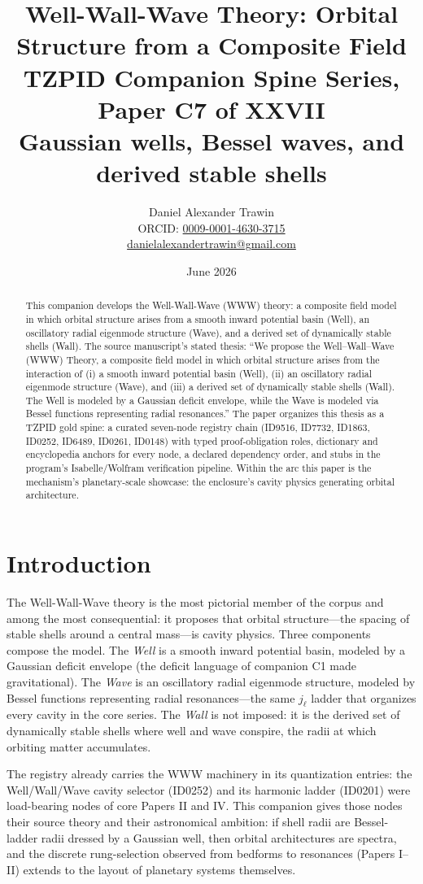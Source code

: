 \documentclass[11pt]{article}
\title{Well-Wall-Wave Theory: Orbital Structure from a Composite Field\\[0.6em]
\large TZPID Companion Spine Series, Paper C7 of XXVII\\
\normalsize Gaussian wells, Bessel waves, and derived stable shells}
\author{Daniel Alexander Trawin\\
\small ORCID: \href{https://orcid.org/0009-0001-4630-3715}{0009-0001-4630-3715}\\
\small \href{mailto:danielalexandertrawin@gmail.com}{danielalexandertrawin@gmail.com}}
\date{June 2026}
\theoremstyle{remark}
\begin{document}
\maketitle

\begin{abstract}
This companion develops the Well-Wall-Wave (WWW) theory: a composite field model in which orbital structure arises from a smooth inward potential basin (Well), an oscillatory radial eigenmode structure (Wave), and a derived set of dynamically stable shells (Wall).
The source manuscript's stated thesis: ``We propose the Well--Wall--Wave (WWW) Theory, a composite field model in which orbital structure arises from the interaction of (i) a smooth inward potential basin (Well), (ii) an oscillatory radial eigenmode structure (Wave), and (iii) a derived set of dynamically stable shells (Wall). The Well is modeled by a Gaussian deficit envelope, while the Wave is modeled via Bessel functions representing radial resonances.'' The paper organizes this thesis as a TZPID gold spine: a curated seven-node registry chain (ID9516, ID7732, ID1863, ID0252, ID6489, ID0261, ID0148) with typed proof-obligation roles, dictionary and encyclopedia anchors for every node, a declared dependency order, and stubs in the program's Isabelle/Wolfram verification pipeline. Within the arc this paper is the mechanism's planetary-scale showcase: the enclosure's cavity physics generating orbital architecture.
\end{abstract}

\section{Introduction}
\label{sec:intro}

The Well-Wall-Wave theory is the most pictorial member of the corpus and among the most consequential: it proposes that orbital structure---the spacing of stable shells around a central mass---is cavity physics. Three components compose the model. The \emph{Well} is a smooth inward potential basin, modeled by a Gaussian deficit envelope (the deficit language of companion C1 made gravitational). The \emph{Wave} is an oscillatory radial eigenmode structure, modeled by Bessel functions representing radial resonances---the same $j_\ell$ ladder that organizes every cavity in the core series. The \emph{Wall} is not imposed: it is the derived set of dynamically stable shells where well and wave conspire, the radii at which orbiting matter accumulates.

The registry already carries the WWW machinery in its quantization entries: the Well/Wall/Wave cavity selector (ID0252) and its harmonic ladder (ID0201) were load-bearing nodes of core Papers II and IV. This companion gives those nodes their source theory and their astronomical ambition: if shell radii are Bessel-ladder radii dressed by a Gaussian well, then orbital architectures are spectra, and the discrete rung-selection observed from bedforms to resonances (Papers I--II) extends to the layout of planetary systems themselves.
\end{document}
